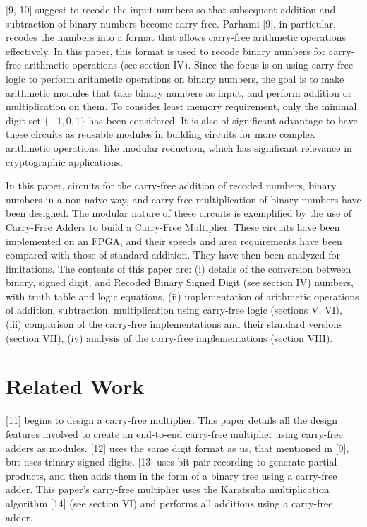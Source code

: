 \documentclass[conference]{IEEEtran_NCC}
\begin{document}
[9, 10] suggest to recode the input numbers so that subsequent addition and subtraction of binary numbers become carry-free. Parhami [9], in particular, recodes the numbers into a format that allows carry-free arithmetic operations effectively. In this paper, this format is used to recode binary numbers for carry-free arithmetic operations (see section IV). Since the focus is on using carry-free logic to perform arithmetic operations on binary numbers, the goal is to make arithmetic modules that take binary numbers as input, and perform addition or multiplication on them. To consider least memory requirement, only the minimal digit set $\{-1, 0, 1\}$ has been considered. It is also of significant advantage to have these circuits as reusable modules in building circuits for more complex arithmetic operations, like modular reduction, which has significant relevance in cryptographic applications.

In this paper, circuits for the carry-free addition of recoded numbers, binary numbers in a non-naive way, and carry-free multiplication of binary numbers have been designed. The modular nature of these circuits is exemplified by the use of Carry-Free Adders to build a Carry-Free Multiplier. These circuits have been implemented on an FPGA, and their speeds and area requirements have been compared with those of standard addition. They have then been analyzed for limitations. The contents of this paper are: (i) details of the conversion between binary, signed digit, and Recoded Binary Signed Digit (see section IV) numbers, with truth table and logic equations, (ii) implementation of arithmetic operations of addition, subtraction, multiplication using carry-free logic (sections V, VI), (iii) comparison of the carry-free implementations and their standard versions (section VII), (iv) analysis of the carry-free implementations (section VIII).


\section{Related Work}

[11] begins to design a carry-free multiplier. This paper details all the design features involved to create an end-to-end carry-free multiplier using carry-free adders as modules. [12] uses the same digit format as us, that mentioned in [9], but uses trinary signed digits. [13] uses bit-pair recording to generate partial products, and then adds them in the form of a binary tree using a carry-free adder. This paper's carry-free multiplier uses the Karatsuba multiplication algorithm [14] (see section VI) and performs all additions using a carry-free adder.
\end{document}

